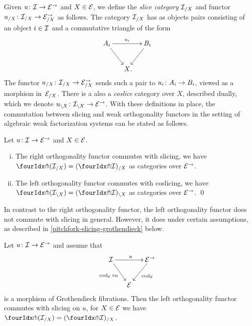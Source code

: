 \documentclass[reqno,10pt,a4paper,oneside,draft]{amsart}
\begin{document}
{{Given $u \co \cal{I} \to \catE^\to$ and $X \in \catE$, we define the \emph{slice category} $\cal{I}_{/X}$ and functor $u_{/X} \co \cal{I}_{/X} \to \catE_{/X}^\to$ as follows.
The category $\cal{I}_{/X}$ has as objects pairs consisting of an object $i \in \cal{I}$ and a commutative triangle of the form
\[
\xymatrix@C-1em{
  A_i
  \ar[dr]
  \ar[rr]^{u_i}
&&
  B_i
  \ar[dl]
\\&
  X
\rlap{.}}
\]
The functor $u_{/X} \co \cal{I}_{/X} \to \catE_{/X}^\to$ sends such a pair to $u_i \co A_i \to B_i$, viewed as a morphism in~$\catE_{/X}$.
There is a also a \emph{coslice} category over $X$, described dually,  which we denote $u_{\backslash X} \co  \cal{I}_{\backslash X} 
\to \catE^\to$. With these definitions in place, the commutation between slicing and weak orthogonality functors in the setting of algebraic weak factorization systems can be stated as follows.

\begin{proposition} \label{pitchfork-slicing}
Let $u \co \cal{I} \to \catE^\to$ and $X \in \cal{E}$.
\begin{enumerate}[(i)]
\item The right orthogonality functor commutes with slicing, \ie we have $\liftr{(\cal{I}_{/X})} = (\liftr{\cal{I}})_{/X}$ 
as categories over $\catE^\to$.
\item The left orthogonality functor commutes with coslicing, \ie we have $\liftl{(\cal{I}_{\backslash X})} = (\liftl{\cal{I}})_{\backslash X}$
as categories over $\catE^\to$.
\qed
\end{enumerate}
\end{proposition}

In contrast to the right orthogonality functor, the left orthogonality functor does not commute with slicing in general.
However, it does under certain assumptions, as described in \cref{pitchfork-slicing-grothendieck} below. 

\begin{proposition} \label{pitchfork-slicing-grothendieck}
Let $u \co \cal{I} \to \cal{E}^\to$ and assume that
\[
\xymatrix@C-1em{
  \cal{I}
  \ar[rr]^{u}
  \ar[dr]_{\cod_{\cal{E}} \cc u}
&&
  \cal{E}^\to
  \ar[dl]^{\cod_{\cal{E}}}
\\&
  \cal{E}
}
\]
is a morphism of Grothendieck fibrations.
Then the left orthogonality functor commutes with slicing on $u$, \ie for $X \in \cal{E}$ we have
$\liftl{(\cal{I}_{/X})} = (\liftl{\cal{I}})_{/X}$.
\end{proposition}

}}
\end{document}
